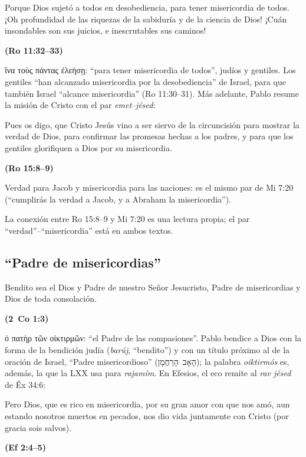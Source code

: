 \documentclass[11pt,letterpaper]{article}
\newcommand{\heb}[1]{\mbox{\foreignlanguage{hebrew}{#1}}}
\newcommand{\grc}[1]{\foreignlanguage{ancientgreek}{#1}}
\newcommand{\fuente}[1]{\par\hfill{\upshape\bfseries\small\textcolor{azul}{#1}}}
\begin{document}
\begin{cita}Porque Dios sujetó a todos en desobediencia, para tener misericordia de todos. ¡Oh profundidad de las riquezas de la sabiduría y de la ciencia de Dios! ¡Cuán insondables son sus juicios, e inescrutables sus caminos!\fuente{(Ro 11:32--33)}\end{cita}

\grc{ἵνα τοὺς πάντας ἐλεήσῃ}: ``para tener misericordia de todos'', judíos y gentiles. Los gentiles ``han alcanzado misericordia por la desobediencia'' de Israel, para que también Israel ``alcance misericordia'' (Ro 11:30--31). Más adelante, Pablo resume la misión de Cristo con el par \emph{emet}--\emph{jésed}:

\begin{cita}Pues os digo, que Cristo Jesús vino a ser siervo de la circuncisión para mostrar la verdad de Dios, para confirmar las promesas hechas a los padres, y para que los gentiles glorifiquen a Dios por su misericordia.\fuente{(Ro 15:8--9)}\end{cita}

Verdad para Jacob y misericordia para las naciones: es el mismo par de Mi 7:20 (``cumplirás la verdad a Jacob, y a Abraham la misericordia'').

\begin{nota}[Precisión]
La conexión entre Ro 15:8--9 y Mi 7:20 es una lectura propia; el par ``verdad''--``misericordia'' está en ambos textos.
\end{nota}

\subsection{``Padre de misericordias''}
\begin{cita}Bendito sea el Dios y Padre de nuestro Señor Jesucristo, Padre de misericordias y Dios de toda consolación.\fuente{(2~Co 1:3)}\end{cita}

\grc{ὁ πατὴρ τῶν οἰκτιρμῶν}: ``el Padre de las compasiones''. Pablo bendice a Dios con la forma de la bendición judía (\emph{barúj}, ``bendito'') y con un título próximo al de la oración de Israel, ``Padre misericordioso'' (\heb{הָאָב הָרַחֲמָן}); la palabra \emph{oiktirmós} es, además, la que la LXX usa para \emph{rajamím}. En Efesios, el eco remite al \emph{rav jésed} de Éx 34:6:

\begin{cita}Pero Dios, que es rico en misericordia, por su gran amor con que nos amó, aun estando nosotros muertos en pecados, nos dio vida juntamente con Cristo (por gracia sois salvos).\fuente{(Ef 2:4--5)}\end{cita}
\end{document}
